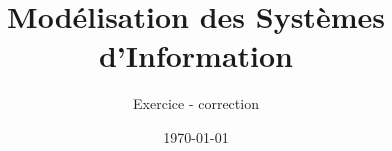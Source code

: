 \title{
   Modélisation des Systèmes d'Information
}
\author{
	Exercice - correction
}
\date{\today}

